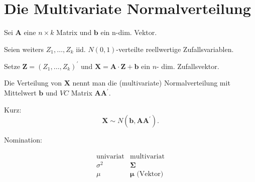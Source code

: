 \documentclass{tstextbook}
\begin{document}
\section{Die Multivariate Normalverteilung}


\begin{definition}
	
	Sei $\textbf{A}$ eine $n\times k$ Matrix und $\textbf{b}$ ein n-dim. Vektor. 
	
	Seien weiters $Z_{1},\ldots,Z_{k}$ iid. $N(0,1)$-verteilte reellwertige Zufallsvariablen. 
	
	Setze $\textbf{Z}=\left(Z_{1},\ldots,Z_{k}\right)^{\prime}$ und $\textbf{X}=\textbf{A}\cdot \textbf{Z}+\textbf{b}$
	ein $n$- dim. Zufallsvektor.
	
	Die Verteilung von $\textbf{X}$ nennt man die (multivariate) Normalverteilung
	mit Mittelwert $\textbf{b}$ und $VC$ Matrix $\textbf{A}\textbf{A}^{\prime}.$
	
	Kurz: 
	\[
	\textbf{X}\sim N(\textbf{b},\textbf{A}\textbf{A}^{\prime}).
	\]
	
	Nomination:
	
	\[
	\begin{array}{cc}
		\text{univariat} & \text{multivariat}\\
		\sigma^{2} & \boldsymbol{\Sigma}\\
		\mu & \boldsymbol{\mu}\text{ (Vektor)}
	\end{array}
	\]
	\end{definition}
\end{document}
